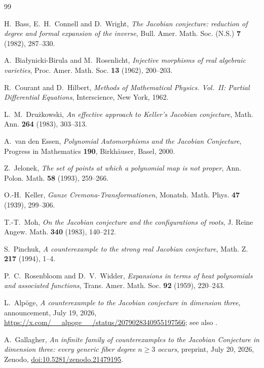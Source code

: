 \documentclass[11pt]{article}
\theoremstyle{plain}
\theoremstyle{definition}
\theoremstyle{remark}
\begin{document}
\begin{thebibliography}{99}

H.~Bass, E.~H.~Connell and D.~Wright,
\emph{The Jacobian conjecture: reduction of degree and formal expansion of the
inverse}, Bull. Amer. Math. Soc. (N.S.) \textbf{7} (1982), 287--330.

A.~Bia{\l}ynicki-Birula and M.~Rosenlicht,
\emph{Injective morphisms of real algebraic varieties},
Proc. Amer. Math. Soc. \textbf{13} (1962), 200--203.

R.~Courant and D.~Hilbert,
\emph{Methods of Mathematical Physics. Vol.~II: Partial Differential
Equations}, Interscience, New York, 1962.

L.~M.~Dru\.zkowski,
\emph{An effective approach to Keller's Jacobian conjecture},
Math. Ann. \textbf{264} (1983), 303--313.

A.~van den Essen,
\emph{Polynomial Automorphisms and the Jacobian Conjecture},
Progress in Mathematics \textbf{190}, Birkh\"auser, Basel, 2000.

Z.~Jelonek,
\emph{The set of points at which a polynomial map is not proper},
Ann. Polon. Math. \textbf{58} (1993), 259--266.

O.-H.~Keller,
\emph{Ganze Cremona-Transformationen},
Monatsh. Math. Phys. \textbf{47} (1939), 299--306.

T.-T.~Moh,
\emph{On the Jacobian conjecture and the configurations of roots},
J. Reine Angew. Math. \textbf{340} (1983), 140--212.

S.~Pinchuk,
\emph{A counterexample to the strong real Jacobian conjecture},
Math. Z. \textbf{217} (1994), 1--4.

P.~C.~Rosenbloom and D.~V.~Widder,
\emph{Expansions in terms of heat polynomials and associated functions},
Trans. Amer. Math. Soc. \textbf{92} (1959), 220--243.

L.~Alp\"oge,
\emph{A counterexample to the Jacobian conjecture in dimension three},
announcement, July 19, 2026,
\url{https://x.com/__alpoge__/status/2079028340955197566}; see also
\cite{SBS2026,Tao2026}.

A.~Gallagher,
\emph{An infinite family of counterexamples to the Jacobian Conjecture in
dimension three: every generic fiber degree $n\ge3$ occurs},
preprint, July 20, 2026, Zenodo, \href{https://doi.org/10.5281/zenodo.21479195}{doi:10.5281/zenodo.21479195}.


\end{thebibliography}
\end{document}
